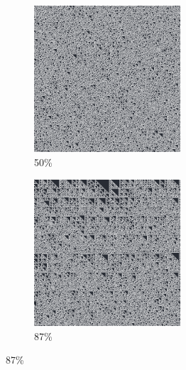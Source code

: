 \documentclass[12pt, fleqn]{report}                             %
\theoremstyle{break}                                            %
\begin{document}
\begin{figure}[ht!]
\begin{subfigure}[b]{0.4\linewidth}
          \includegraphics[width=0.6\textwidth]{Images/60/c.png}
          \caption{50\%}
        \end{subfigure}
        \begin{subfigure}[b]{0.4\linewidth}
          \includegraphics[width=0.6\textwidth]{Images/60/d.png}
          \caption{87\%}
        \end{subfigure}
      \end{figure}
\end{document}
